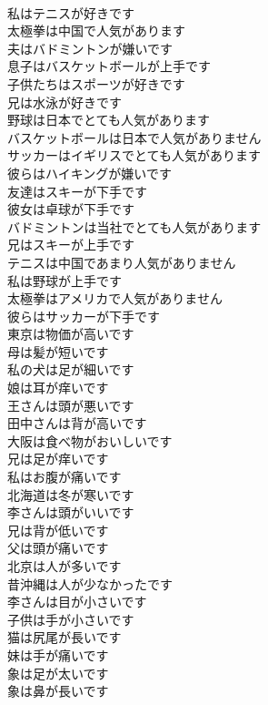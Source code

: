 \documentclass[8pt]{extreport}
\begin{document}
\begin{CJK}{UTF8}{min}
\\	私はテニスが好きです	
\\	太極拳は中国で人気があります	
\\	夫はバドミントンが嫌いです	
\\	息子はバスケットボールが上手です	
\\	子供たちはスポーツが好きです	
\\	兄は水泳が好きです	
\\	野球は日本でとても人気があります	
\\	バスケットボールは日本で人気がありません	
\\	サッカーはイギリスでとても人気があります	
\\	彼らはハイキングが嫌いです	
\\	友達はスキーが下手です	
\\	彼女は卓球が下手です	
\\	バドミントンは当社でとても人気があります	
\\	兄はスキーが上手です	
\\	テニスは中国であまり人気がありません	
\\	私は野球が上手です	
\\	太極拳はアメリカで人気がありません	
\\	彼らはサッカーが下手です	
\\	東京は物価が高いです	
\\	母は髪が短いです	
\\	私の犬は足が細いです	
\\	娘は耳が痒いです	
\\	王さんは頭が悪いです	
\\	田中さんは背が高いです	
\\	大阪は食べ物がおいしいです	
\\	兄は足が痒いです	
\\	私はお腹が痛いです	
\\	北海道は冬が寒いです	
\\	李さんは頭がいいです	
\\	兄は背が低いです	
\\	父は頭が痛いです	
\\	北京は人が多いです	
\\	昔沖縄は人が少なかったです	
\\	李さんは目が小さいです	
\\	子供は手が小さいです	
\\	猫は尻尾が長いです	
\\	妹は手が痛いです	
\\	象は足が太いです	
\\	象は鼻が長いです	

\end{CJK}
\end{document}
